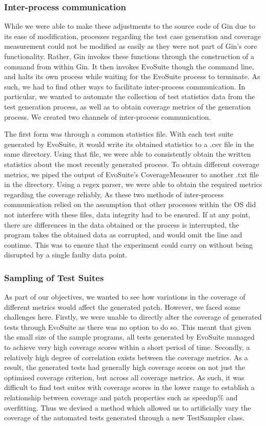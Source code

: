 \documentclass[titlepage]{article}
\begin{document}
\subsubsection{Inter-process communication}
While we were able to make these adjustments to the source code of Gin due to its ease of modification, processes regarding the test case generation and coverage measurement could not be modified as easily as they were not part of Gin’s core functionality. Rather, Gin invokes these functions through the construction of a command from within Gin. It then invokes EvoSuite though the command line, and halts its own process while waiting for the EvoSuite process to terminate. As such, we had to find other ways to facilitate inter-process communication. In particular, we wanted to automate the collection of test statistics data from the test generation process, as well as to obtain coverage metrics of the generation process. We created two channels of inter-process communication. 

The first form was through a common statistics file. With each test suite generated by EvoSuite, it would write its obtained statistics to a .csv file in the same directory. Using that file, we were able to consistently obtain the written statistics about the most recently generated process. To obtain different coverage metrics, we piped the output of EvoSuite's CoverageMeasurer to another .txt file in the directory. Using a regex parser, we were able to obtain the required metrics regarding the coverage reliably, As these two methods of inter-process communication relied on the assumption that other processes within the OS did not interfere with these files, data integrity had to be ensured. If at any point, there are differences in the data obtained or the process is interrupted, the program takes the obtained data as corrupted, and would omit the line and continue. This was to ensure that the experiment could carry on without being disrupted by a single faulty data point.

\subsubsection{Sampling of Test Suites}
As part of our objectives, we wanted to see how variations in the coverage of different metrics would affect the generated patch. However, we faced some challenges here. Firstly, we were unable to directly alter the coverage of generated tests through EvoSuite as there was no option to do so. This meant that given the small size of the sample programs, all tests generated by EvoSuite managed to achieve very high coverage scores within a short period of time. Secondly, a relatively high degree of correlation exists between the coverage metrics. As a result, the generated tests had generally high coverage scores on not just the optimised coverage criterion, but across all coverage metrics. As such, it was difficult to find test suites with coverage scores in the lower range to establish a relationship between coverage and patch properties such as speedup\% and overfitting. Thus we devised a method which allowed us to artificially vary the coverage of the automated tests generated through a new TestSampler class.
\end{document}
